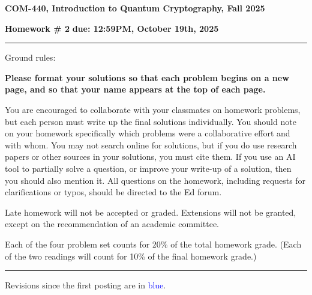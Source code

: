 \documentclass[12pt]{article}
\newcommand{\header}[1]{\begin{center} {\large\bf #1} \end{center}}
\begin{document}
\header{COM-440, Introduction to Quantum Cryptography, Fall 2025}
{\bf Homework \# 2} \hfill {\bf due: 12:59PM, {\color{blue}October 19th}, 2025}


\medskip

\hrule

\medskip 

Ground rules: 

{\bf Please
  format your solutions so that each problem begins on a new page, and
  so that your name appears at the top of each page.}

You are encouraged to collaborate with your classmates on
homework problems, but each person must write up the final solutions
individually. You should note on your homework specifically which
problems were a collaborative effort and with whom. You may not search
online for solutions, but if you do use research papers or other
sources in your solutions, you must cite them. If you use an AI tool to 
partially solve a question, or improve your write-up of a solution, then 
you should also mention it. All questions on the homework, including requests for clarifications or typos, should be directed to the Ed forum.

Late homework will not be accepted or graded. Extensions will not be granted, except on the recommendation of an academic committee. 

Each of the four problem set counts for 20\% of the total homework grade. (Each of the two readings will count for 10\% of the final homework grade.)


\medskip

\hrule

\medskip


Revisions since the first posting are in \textcolor{blue}{blue}.
\end{document}
